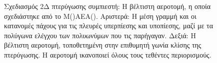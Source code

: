 \begin{figure}[h!]
\begin{minipage}[b]{1\linewidth}
 \centering
\end{minipage}
\caption{Σχεδιασμός 2Δ πτερύγωσης συμπιεστή: Η βέλτιστη αεροτομή, η οποία σχεδιάστηκε από το Μ()ΑΕΑ(). Αριστερά: Η μέση γραμμή και οι κατανομές πάχους για τις πλευρές υπερπίεσης και υποπίεσης, μαζί με τα πολύγωνα ελέγχου των πολυωνύμων  που τις παρήγαγαν. Δεξιά: Η βέλτιστη αεροτομή, τοποθετημένη στην επιθυμητή γωνία κλίσης της πτερύγωσης. Η αεροτομή ικανοποιεί όλους τους τεθέντες περιορισμούς.} 
\label{PCADrelaRes2}
\end{figure}


